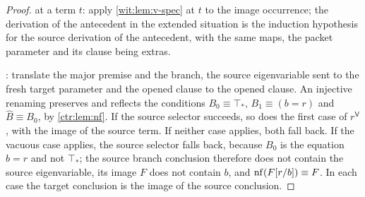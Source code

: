 \begin{proof}
 at a term $t$: apply \cref{wit:lem:v-spec} at $t$ to the image
occurrence; the derivation of the antecedent in the extended situation is
the induction hypothesis for the source derivation of the antecedent, with
the same maps, the packet parameter and its clause being extras.

: translate the major premise and the branch, the source
eigenvariable sent to the fresh target parameter and the opened clause to
the opened clause.  An injective renaming preserves and reflects the
conditions $B_0\equiv\top_{*}$, $B_1\equiv(b=r)$ and $\widehat B\equiv B_0$,
by \cref{ctr:lem:nf}.  If the source selector succeeds, so does the first
case of $r^{\mathsf V}$, with the image of the source term.  If neither case
applies, both fall back.  If the vacuous case applies, the source selector
falls back, because $B_0$ is the equation $b=r$ and not $\top_{*}$; the
source branch conclusion therefore does not contain the source
eigenvariable, its image $F$ does not contain $b$, and
$\operatorname{nf}(F[r/b])\equiv F$.  In each case the target conclusion is the
image of the source conclusion.


\end{proof}
